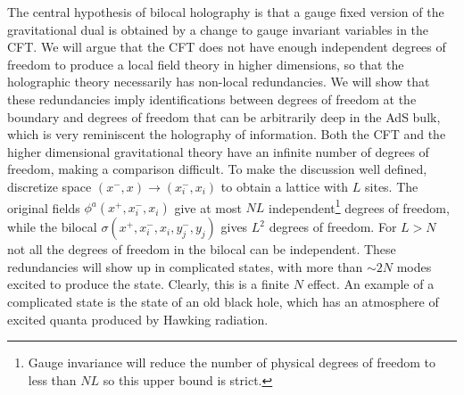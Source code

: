 \documentclass[a4paper,12pt]{article}
\begin{document}
The central hypothesis of bilocal holography is that a gauge fixed version of the gravitational dual is obtained by a change
to gauge invariant variables in the CFT.
We will argue that the CFT does not have enough independent degrees of freedom to produce a local field theory in
higher dimensions, so that the holographic theory necessarily has non-local redundancies.
We will show that these redundancies imply identifications between degrees of freedom at the boundary and degrees of 
freedom that can be arbitrarily deep in the AdS bulk, which is very reminiscent the holography of information. 
Both the CFT and the higher dimensional gravitational theory have an infinite number of degrees of freedom, making
a comparison difficult. 
To make the discussion well defined, discretize space $(x^-,x)\to(x^-_i,x_i)$ to obtain a lattice with $L$ sites.
The original fields $\phi^a(x^+,x^-_i,x_i)$ give at most $NL$ independent\footnote{Gauge invariance will reduce the number
of physical degrees of freedom to less than $NL$ so this upper bound is strict.} degrees of freedom, while the bilocal 
$\sigma(x^+,x^-_i,x_i,y^-_j,y_j)$ gives $L^2$ degrees of freedom. 
For $L>N$ not all the degrees of freedom in the bilocal can be independent.
These redundancies will show up in complicated states, with more than $\sim 2N$ modes excited to produce the state.
Clearly, this is a finite $N$ effect.
An example of a complicated state is the state of an old black hole, which has an atmosphere of excited quanta 
produced by Hawking radiation.
\end{document}
